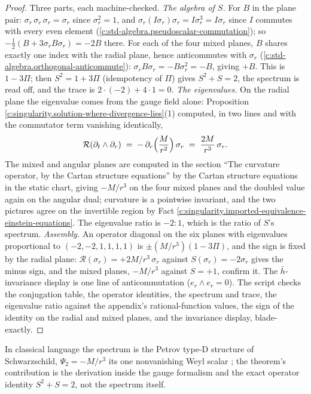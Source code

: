 \documentclass[11pt]{article}
\theoremstyle{definition}
\theoremstyle{plain}
\providecommand{\er}{}\renewcommand{\er}{e_r}
\providecommand{\hb}{}\renewcommand{\hb}{\bar{h}}
\begin{document}
\begin{proof}
Three parts, each machine-checked. \emph{The algebra of $S$.} For $B$ in the plane pair: $\sigma_r\,\sigma_r\,\sigma_r = \sigma_r$ since $\sigma_r^2 = 1$, and $\sigma_r (I\sigma_r)\sigma_r = I\sigma_r^3 = I\sigma_r$ since $I$ commutes with every even element (\ref{c:std-algebra.pseudoscalar-commutation}); so $-\tfrac12(B + 3\sigma_r B\sigma_r) = -2B$ there. For each of the four mixed planes, $B$ shares exactly one index with the radial plane, hence anticommutes with $\sigma_r$ (\ref{c:std-algebra.orthogonal-anticommute}): $\sigma_r B \sigma_r = -B\sigma_r^2 = -B$, giving $+B$. This is $1 - 3\Pi$; then $S^2 = 1 + 3\Pi$ (idempotency of $\Pi$) gives $S^2 + S = 2$, the spectrum is read off, and the trace is $2\cdot(-2) + 4\cdot 1 = 0$. \emph{The eigenvalues.} On the radial plane the eigenvalue comes from the gauge field alone: Proposition \ref{c:singularity.solution-where-divergence-lies}(1) computed, in two lines and with the commutator term vanishing identically,
\[
\mathcal{R}(\partial_t \wedge \partial_r) \;=\; -\,\partial_r\Bigl(\frac{M}{r^2}\Bigr)\,\sigma_r \;=\; \frac{2M}{r^3}\,\sigma_r .
\]
The mixed and angular planes are computed in the section ``The curvature operator, by the Cartan structure equations'' by the Cartan structure equations in the static chart, giving $-M/r^3$ on the four mixed planes and the doubled value again on the angular dual; curvature is a pointwise invariant, and the two pictures agree on the invertible region by Fact \ref{c:singularity.imported-equivalence-einstein-equations}. The eigenvalue ratio is $-2 : 1$, which is the ratio of $S$'s spectrum. \emph{Assembly.} An operator diagonal on the six planes with eigenvalues proportional to $(-2,-2,1,1,1,1)$ is $\pm(M/r^3)(1 - 3\Pi)$, and the sign is fixed by the radial plane: $\mathcal{R}(\sigma_r) = +2M/r^{3}\,\sigma_r$ against $S(\sigma_r) = -2\sigma_r$ gives the minus sign, and the mixed planes, $-M/r^{3}$ against $S = +1$, confirm it. The $\hb$-invariance display is one line of anticommutation ($\er \wedge \er = 0$). The script checks the conjugation table, the operator identities, the spectrum and trace, the eigenvalue ratio against the appendix's rational-function values, the sign of the identity on the radial and mixed planes, and the invariance display, blade-exactly.

\end{proof}

\label{c:note.singularity.setting-steps-4b-4c-compute-completion-2}
In classical language the spectrum is the Petrov type-D structure of Schwarzschild, $\Psi_2 = -M/r^{3}$ its one nonvanishing Weyl scalar \cite{Chandrasekhar1983}; the theorem's contribution is the derivation inside the gauge formalism and the exact operator identity $S^{2} + S = 2$, not the spectrum itself.
\end{document}
